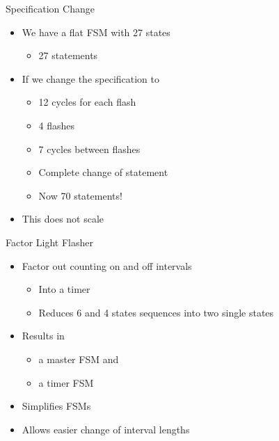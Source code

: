 \begin{frame}[fragile]{Specification Change}
\begin{itemize}
\item We have a flat FSM with 27 states
\begin{itemize}
\item 27  statements
\end{itemize}
\item If we change the specification to
\begin{itemize}
\item 12 cycles for each flash
\item 4 flashes
\item 7 cycles between flashes
\item Complete change of  statement
\item Now 70  statements!
\end{itemize}
\item This does not scale
\end{itemize}
\end{frame}

\begin{frame}[fragile]{Factor Light Flasher}
\begin{itemize}
\item Factor out counting on and off intervals
\begin{itemize}
\item Into a timer
\item Reduces 6 and 4 states sequences into two single states
\end{itemize}
\item Results in
\begin{itemize}
\item a master FSM and
\item a timer FSM
\end{itemize}
\item Simplifies FSMs
\item Allows easier change of interval lengths
\end{itemize}
\end{frame}



